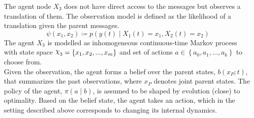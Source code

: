 The agent node $ X_3 $ does not have direct access to the messages but observes a translation of them. The observation model is defined as the likelihood of a translation given the parent messages.
\begin{equation}
\psi(x_1, x_2) \coloneqq p(y(t) \mid X_{1}(t)=x_1, X_{2}(t)=x_2)
\end{equation}
The agent  $ X_{3} $ is modelled as inhomogeneous continuous-time Markov process with state space $ \rchi_{3} = \left\lbrace x_{1}, x_{2}, ..., x_{m} \right\rbrace  $ and set of actions $ a \in \left\lbrace a_{0}, a_{1}, ..., a_{k}\right\rbrace  $ to choose from. \\
Given the observation, the agent forms a belief over the parent states, $  b(x_P; t) $, that summarizes the past observations, where $ x_P $ denotes joint parent states. The policy of the agent, $ \pi(a \mid b) $, is assumed to be shaped by evolution (close) to optimality. Based on the belief state, the agent takes an action, which in the setting described above corresponds to changing its internal dynamics. 

